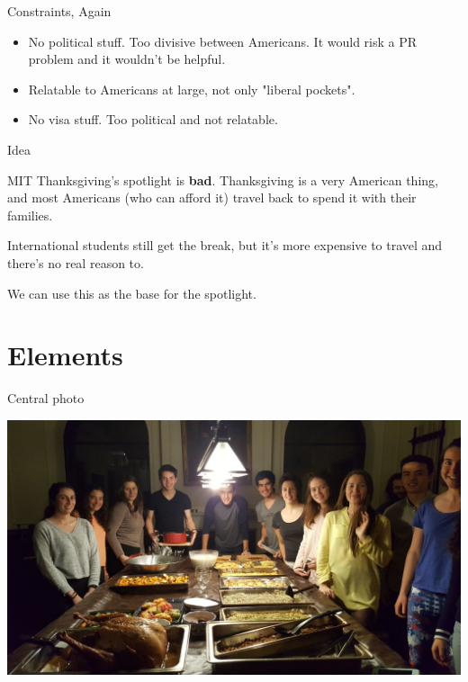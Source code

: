\documentclass[10pt]{beamer}
\begin{document}
\begin{frame}{Constraints, Again}

\begin{itemize}
  \item No political stuff. Too divisive between Americans. It would risk a PR problem 
  and it wouldn't be helpful. 
  \item Relatable to Americans at large, not only "liberal pockets".
  \item No visa stuff. Too political and not relatable.
\end{itemize}

\end{frame}

\begin{frame}{Idea}

MIT Thanksgiving's spotlight is \textbf{bad}. 
Thanksgiving is a very American thing, and most Americans (who can afford it)
travel back to spend it with their families. 

International students still get the break, but it's more expensive to travel
and there's no real reason to.

We can use this as the base for the spotlight. 

\end{frame}


\section{Elements}


\begin{frame}{Central photo}

\begin{center}
\includegraphics[scale=0.20]{Thanksgiving_2017.jpeg}
\end{center}

\end{frame}
\end{document}
